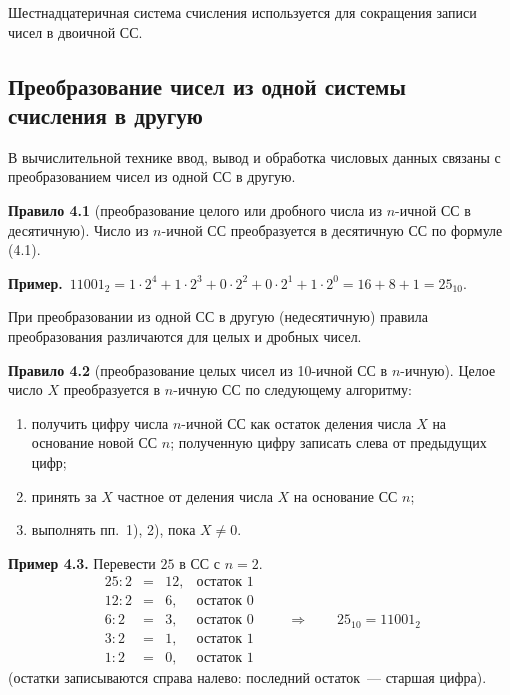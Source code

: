 \documentclass[a4paper,11pt]{article}
\newcommand{\prim}{\textbf{Пример.}\ }
\begin{document}
Шестнадцатеричная система счисления используется для сокращения записи чисел в двоичной СС.

\subsection{Преобразование чисел из одной системы счисления в другую}

В вычислительной технике ввод, вывод и обработка числовых данных связаны с преобразованием чисел
из одной СС в другую.

\begin{opr}
\textbf{Правило 4.1} (преобразование целого или дробного числа из $n$-ичной СС в десятичную).
Число из $n$-ичной СС преобразуется в десятичную СС по формуле (4.1).
\end{opr}

\prim $11001_2 = 1 \cdot 2^4 + 1 \cdot 2^3 + 0 \cdot 2^2 + 0 \cdot 2^1 + 1 \cdot 2^0 = 16 + 8 + 1 = 25_{10}$.

При преобразовании из одной СС в другую (недесятичную) правила преобразования различаются для
целых и дробных чисел.

\begin{opr}
\textbf{Правило 4.2} (преобразование целых чисел из 10-ичной СС в $n$-ичную).
Целое число $X$ преобразуется в $n$-ичную СС по следующему алгоритму:
\begin{enumerate}[label=\arabic*)]
  \item получить цифру числа $n$-ичной СС как остаток деления числа $X$ на основание новой СС $n$;
        полученную цифру записать слева от предыдущих цифр;
  \item принять за $X$ частное от деления числа $X$ на основание СС $n$;
  \item выполнять пп.~1), 2), пока $X \ne 0$.
\end{enumerate}
\end{opr}

\textbf{Пример 4.3.} Перевести $25$ в СС с $n = 2$.
\[
  \begin{array}{rcll}
    25 : 2 &=& 12, & \text{остаток } 1 \\
    12 : 2 &=& 6,  & \text{остаток } 0 \\
     6 : 2 &=& 3,  & \text{остаток } 0 \\
     3 : 2 &=& 1,  & \text{остаток } 1 \\
     1 : 2 &=& 0,  & \text{остаток } 1
  \end{array}
  \qquad\Longrightarrow\qquad 25_{10} = 11001_2
\]
(остатки записываются справа налево: последний остаток~--- старшая цифра).
\end{document}
